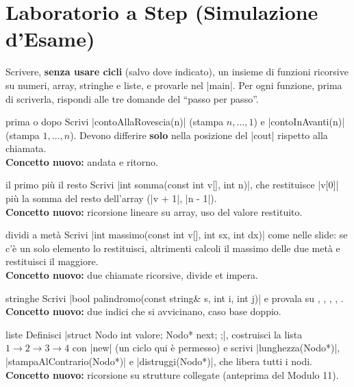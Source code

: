 \section{Laboratorio a Step (Simulazione d'Esame)}

\begin{traccia}
Scrivere, \textbf{senza usare cicli} (salvo dove indicato), un insieme di funzioni
ricorsive su numeri, array, stringhe e liste, e provarle nel \cc|main|. Per ogni
funzione, prima di scriverla, rispondi alle tre domande del ``passo per passo''.
\end{traccia}

\begin{step}{prima o dopo}
Scrivi \cc|contoAllaRovescia(n)| (stampa $n, \ldots, 1$) e \cc|contoInAvanti(n)|
(stampa $1, \ldots, n$). Devono differire \textbf{solo} nella posizione del \cc|cout|
rispetto alla chiamata.\\[0.3em]
\textbf{Concetto nuovo:} andata e ritorno.
\end{step}

\begin{step}{il primo più il resto}
Scrivi \cc|int somma(const int v[], int n)|, che restituisce \cc|v[0]| più la somma
del resto dell'array (\cc|v + 1|, \cc|n - 1|).\\[0.3em]
\textbf{Concetto nuovo:} ricorsione lineare su array, uso del valore restituito.
\end{step}

\begin{step}{dividi a metà}
Scrivi \cc|int massimo(const int v[], int sx, int dx)| come nelle slide: se c'è un
solo elemento lo restituisci, altrimenti calcoli il massimo delle due metà e
restituisci il maggiore.\\[0.3em]
\textbf{Concetto nuovo:} due chiamate ricorsive, divide et impera.
\end{step}

\begin{step}{stringhe}
Scrivi \cc|bool palindromo(const string& s, int i, int j)| e provala su
, , , , .\\[0.3em]
\textbf{Concetto nuovo:} due indici che si avvicinano, caso base doppio.
\end{step}

\begin{step}{liste}
Definisci \cc|struct Nodo { int valore; Nodo* next; };|, costruisci la lista
$1 \to 2 \to 3 \to 4$ con \cc|new| (un ciclo qui è permesso) e scrivi
\cc|lunghezza(Nodo*)|, \cc|stampaAlContrario(Nodo*)| e \cc|distruggi(Nodo*)|, che
libera tutti i nodi.\\[0.3em]
\textbf{Concetto nuovo:} ricorsione su strutture collegate (anteprima del Modulo 11).
\end{step}

